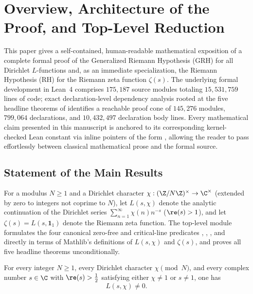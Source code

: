 \section{Overview, Architecture of the Proof, and Top-Level Reduction}
\label{sec:ch01-overview-and-spine}

This paper gives a self-contained, human-readable mathematical exposition of a
complete formal proof of the Generalized Riemann Hypothesis (GRH) for all
Dirichlet $L$-functions and, as an immediate specialization, the Riemann
Hypothesis (RH) for the Riemann zeta function $\zeta(s)$.
The underlying formal development in Lean~4 comprises $175{,}187$ source
modules totaling $15{,}531{,}759$ lines of code; exact declaration-level
dependency analysis rooted at the five headline theorems of 
identifies a reachable proof cone of $145{,}276$ modules, $799{,}064$
declarations, and $10{,}432{,}497$ declaration body lines.
Every mathematical claim presented in this manuscript is anchored to its
corresponding kernel-checked Lean constant via inline pointers of the form
, allowing the reader to pass effortlessly
between classical mathematical prose and the formal source.

\subsection{Statement of the Main Results}
\label{subsec:ch01-main-results}

For a modulus $N \ge 1$ and a Dirichlet character
$\chi : (\Z/N\Z)^{\times} \to \C^{\times}$ (extended by zero to integers not
coprime to $N$), let $L(s, \chi)$ denote the analytic continuation of the
Dirichlet series $\sum_{n=1}^{\infty} \chi(n) n^{-s}$ ($\re(s) > 1$), and let
$\zeta(s) = L(s, \mathbf{1}_1)$ denote the Riemann zeta function.
The top-level module  formulates the four canonical
zero-free and critical-line predicates
,
,
, and
 directly in terms of Mathlib's definitions of
$L(s, \chi)$ and $\zeta(s)$, and  proves all five headline
theorems unconditionally.

\begin{theorem}
\label{thm:ch01-half-plane}
For every integer $N \ge 1$, every Dirichlet character $\chi \pmod{N}$, and
every complex number $s \in \C$ with $\re(s) > \tfrac{1}{2}$ satisfying either
$\chi \neq 1$ or $s \neq 1$, one has
\[
  L(s, \chi) \neq 0.
\]
\end{theorem}

